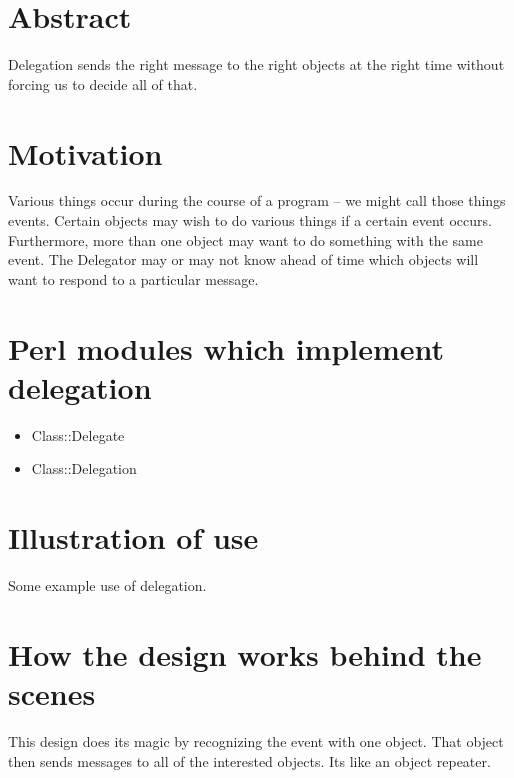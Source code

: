 
    \section{Abstract}

Delegation sends the right message to the right objects at the right time
without forcing us to decide all of that.

    \section{Motivation}
    
Various things occur during the course of a program -- we might call those
things events.  Certain objects may wish to do various things if a certain
event occurs.  Furthermore, more than one object may want to do something
with the same event.  The Delegator may or may not know ahead of time which
objects will want to respond to a particular message.

    \section{Perl modules which implement delegation}
    
\begin{itemize}
\item Class::Delegate
\item Class::Delegation
\end{itemize}

    \section{Illustration of use}
    
Some example use of delegation.

    \section{How the design works behind the scenes}

This design does its magic by recognizing the event with one object.  That
object then sends messages to all of the interested objects.  Its like an 
object repeater.
